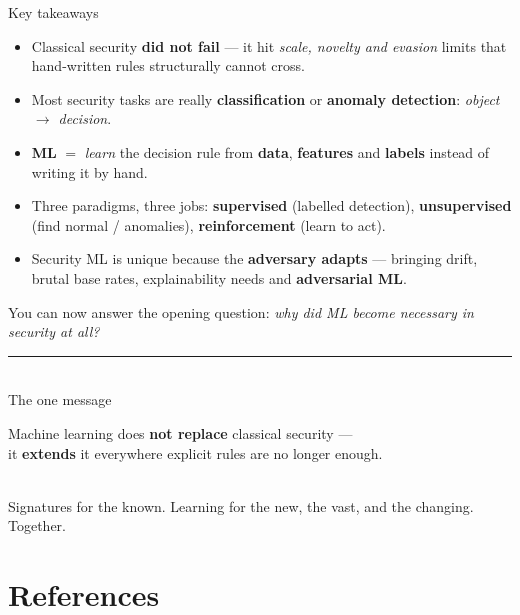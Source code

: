 \documentclass[aspectratio=169,10pt]{beamer}
\newcommand{\term}[1]{{\color{mlink}\textbf{#1}}}         %
\newcommand{\mlterm}[1]{{\color{accent}\textsf{\textbf{#1}}}} %
\begin{document}
\begin{frame}{Key takeaways}
  \small
  \begin{itemize}\setlength\itemsep{2pt}
    \item Classical security \term{did not fail} --- it hit \emph{scale, novelty
          and evasion} limits that hand-written rules structurally cannot cross.
    \item Most security tasks are really \mlterm{classification} or
          \mlterm{anomaly detection}: \emph{object $\to$ decision}.
    \item \mlterm{ML} $=$ \emph{learn} the decision rule from \term{data},
          \term{features} and \term{labels} instead of writing it by hand.
    \item Three paradigms, three jobs: \mlterm{supervised} (labelled detection),
          \mlterm{unsupervised} (find normal / anomalies), \mlterm{reinforcement}
          (learn to act).
    \item Security ML is unique because the \term{adversary adapts} --- bringing
          drift, brutal base rates, explainability needs and \term{adversarial ML}.
  \end{itemize}
  \vfill
  {\footnotesize\color{midgray}You can now answer the opening question:
  \emph{why did ML become necessary in security at all?}}
\end{frame}

{
\begin{frame}
  \vfill\centering
  {\color{mlsig}\rule{0.3\paperwidth}{2.5pt}}\\[1.0em]
  {\color{mlink}The one message}\\[0.8em]
  \begin{minipage}{0.82\textwidth}
    \centering\large\color{mlink}
    Machine learning does \textbf{not replace} classical security --- \\[0.3em]
    it \textbf{extends} it everywhere explicit rules are no longer enough.
  \end{minipage}\\[1.2em]
  {\footnotesize\color{midgray}Signatures for the known. Learning for the new,
  the vast, and the changing. Together.}
  \vfill
\end{frame}}

\section{References}
\end{document}

